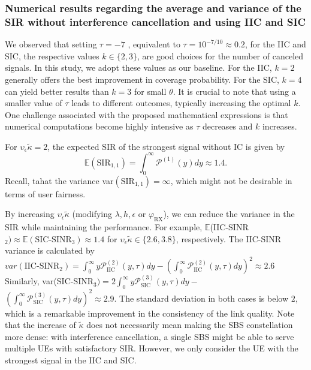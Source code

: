 \documentclass[lettersize,journal]{IEEEtran}
\begin{document}
\subsubsection{Numerical results regarding the average and variance of the SIR without interference cancellation and using IIC and SIC}


We observed that setting $\tau = -7$ , equivalent to $\tau = 10^{-7/10} \approx 0.2$, for the IIC and SIC, the respective values $k \in \{2,3\}$, are good choices for the number of canceled signals. In this study, we adopt these values as our baseline. For the IIC, $k = 2$ generally offers the best improvement in coverage probability. For the SIC, $k = 4$ can yield better results than $k = 3$ for small $\theta$. It is crucial to note that using a smaller value of $\tau$ leads to different outcomes, typically increasing the optimal $k$. One challenge associated with the proposed mathematical expressions is that numerical computations become highly intensive as $\tau$ decreases and $k$ increases.


For $\upsilon_{\epsilon} \tilde{\kappa}=2$, the expected SIR of the strongest signal without IC is given by
\begin{equation}
  \mathbb{E}(\text{SIR}_{1,1})= \int_{0}^{\infty}\mathcal{P}^{(1)}(y)dy \approx 1.4.
\end{equation}
  Recall, tahat the variance var$(\text{SIR}_{1,1})=\infty$, which might not be desirable in terms of user fairness.

  By increasing $\upsilon_{\epsilon} \tilde{\kappa}$ (modifying $\lambda,h,\epsilon$ or $\varphi_{\text{RX}}$), we can reduce the variance in the SIR while maintaining the performance. For example, $ \mathbb{E}$(IIC-SINR$_{2}) \approx \mathbb{E}(\text{SIC-SINR}_{3}) \approx 1.4$ for $\upsilon_{\epsilon} \tilde{\kappa}\in \{2.6,3.8\}$, respectively. The IIC-SINR variance is calculated by
  $var(\text{IIC-SINR}_{2})=\int_{0}^{\infty}y\mathcal{P}_{\text{IIC}}^{(2)}(y,\tau)dy -\left(\int_{0}^{\infty}\mathcal{P}_{\text{IIC}}^{(2)}(y,\tau)dy\right)^2  \approx 2.6$ Similarly, var(SIC-SINR$_{3}) = 2\int_{0}^{\infty}y\mathcal{P}_{\text{SIC}}^{(3)}(y,\tau)dy-$ $\left(\int_{0}^{\infty}\mathcal{P}_{\text{SIC}}^{(3)}(y,\tau)dy\right)^2 \approx 2.9$. The standard deviation in both cases is below $2$, which is a remarkable improvement in the consistency of the link quality. Note that the increase of $\tilde{\kappa}$ does not necessarily mean making the SBS constellation more dense: with interference cancellation, a single SBS might be able to serve multiple UEs with satisfactory SIR. However, we only consider the UE with the strongest signal in the IIC and SIC.
\end{document}
